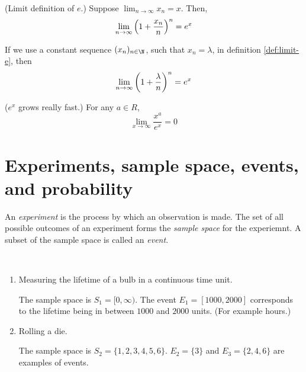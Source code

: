 \documentclass[11pt]{article}
\begin{document}
\begin{defn}{(Limit definition of $e$.)}
    \label{def:limit-e}
    Suppose $\lim_{n\to\infty} x_n = x$. Then,
    \begin{equation}
        \label{eq:limit-e}
        \lim_{n\to\infty} {
            \left(
                1 + \frac{x_n}{n}
            \right)^n
        }
        =
        e^x
    \end{equation}
\end{defn}

\begin{rem}
    If we use a constant sequence $(x_n)_{n\in\N}$, such that $x_n = \lambda$,
    in definition \ref{def:limit-e}, then
    \begin{equation*}
        \lim_{n\to\infty} {
            \left(
                1 + \frac{\lambda}{n}
            \right)^n
        }
        =
        e^x
    \end{equation*}
\end{rem}

\begin{rem}{($e^x$ grows really fast.)}
    For any $a \in R$,
    \begin{equation*}
        \lim_{x\to\infty} {
            \frac{x^a}{e^x}
        }
        = 0
    \end{equation*}
\end{rem}

\section{Experiments, sample space, events, and probability}

\begin{defn}
    An \emph{experiment} is the process by which an observation is made. The
    set of all possible outcomes of an experiment forms the \emph{sample space}
    for the experiemnt. A subset of the sample space is called an \emph{event}.
\end{defn}

\begin{eg} ~

    \begin{enumerate}
        \item Measuring the lifetime of a bulb in a continuous time unit.

            The sample space is $S_1 = [0, \infty)$.
            The event $E_1 = [1000, 2000]$ corresponds to the lifetime being in
            between $1000$ and $2000$ units. (For example hours.)

        \item Rolling a die.

            The sample space is $S_2 = \{1,2,3,4,5,6\}$.
            $E_2 = \{3\}$ and $E_3 = \{2,4,6\}$ are examples of events.
    \end{enumerate}
\end{eg}
\end{document}
